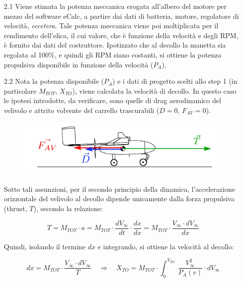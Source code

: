 \documentclass[12pt]{article}
\begin{document}
\begin{itemize}
\item[2.1] Viene stimata la potenza meccanica erogata all'albero del motore per mezzo del software eCalc, a partire dai dati di batteria, motore, regolatore di velocità, \textit{eccetera}. Tale potenza meccanica viene poi moltiplicata per il rendimento dell'elica, il cui valore, che è funzione della velocità e degli RPM, è fornito dai dati del costruttore. Ipotizzato che al decollo la manetta sia regolata al 100\%, e quindi gli RPM siano costanti, si ottiene la potenza propulsiva disponibile in funzione della velocità ($P_A$).

\item[2.2] Nota la potenza disponibile ($P_A$) e i dati di progetto scelti allo step 1 (in particolare $M_{TOT}$, $X_{TO}$), viene calcolata la velocità di decollo. In questo caso le ipotesi introdotte, da verificare, sono quelle di drag aerodinamico del velivolo e attrito volvente del carrello trascurabili ($D = 0$, $F_{AV} = 0$). 

\begin{figure}[h]
	\centering
	\includegraphics[width=13cm]{img/forze}
\end{figure}

Sotto tali assunzioni, per il secondo principio della dinamica, l'accelerazione orizzontale del velivolo al decollo dipende unicamente dalla forza propulsiva (thrust, $T$), secondo la relazione:

\begin{equation}
T = M_{TOT} \cdot a = M_{TOT} \cdot \frac{dV_\infty}{dt} \cdot \frac{dx}{dx} = M_{TOT} \cdot \frac{V_\infty \cdot dV_\infty}{dx}
\end{equation}

\noindent
Quindi, isolando il termine $dx$ e integrando, si ottiene la velocità al decollo:

\begin{equation}
dx = M_{TOT} \cdot \frac{V_\infty \cdot dV_\infty}{T} \quad \Rightarrow \quad X_{TO} = M_{TOT} \cdot \int_0^{V_{TO}} \, \frac{V_\infty^2}{P_A(v)} \cdot dV_\infty
\end{equation}
\end{itemize}
\end{document}
